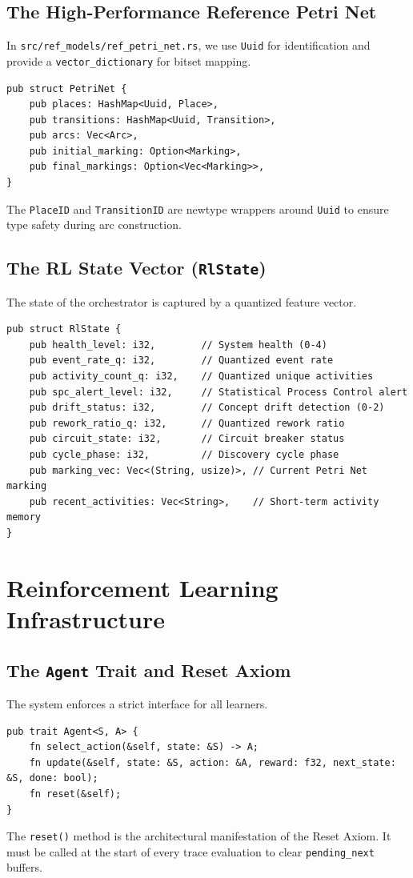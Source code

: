 \documentclass[12pt,a4paper]{report}
\begin{document}
\section{The High-Performance Reference Petri Net}
In \texttt{src/ref\_models/ref\_petri\_net.rs}, we use \texttt{Uuid} for identification and provide a \texttt{vector\_dictionary} for bitset mapping.
\begin{lstlisting}[caption=Ref PetriNet Specification]
pub struct PetriNet {
    pub places: HashMap<Uuid, Place>,
    pub transitions: HashMap<Uuid, Transition>,
    pub arcs: Vec<Arc>,
    pub initial_marking: Option<Marking>,
    pub final_markings: Option<Vec<Marking>>,
}
\end{lstlisting}
The \texttt{PlaceID} and \texttt{TransitionID} are newtype wrappers around \texttt{Uuid} to ensure type safety during arc construction.

\section{The RL State Vector (\texttt{RlState})}
The state of the orchestrator is captured by a quantized feature vector.
\begin{lstlisting}[caption=RlState Struct Specification]
pub struct RlState {
    pub health_level: i32,        // System health (0-4)
    pub event_rate_q: i32,        // Quantized event rate
    pub activity_count_q: i32,    // Quantized unique activities
    pub spc_alert_level: i32,     // Statistical Process Control alert
    pub drift_status: i32,        // Concept drift detection (0-2)
    pub rework_ratio_q: i32,      // Quantized rework ratio
    pub circuit_state: i32,       // Circuit breaker status
    pub cycle_phase: i32,         // Discovery cycle phase
    pub marking_vec: Vec<(String, usize)>, // Current Petri Net marking
    pub recent_activities: Vec<String>,    // Short-term activity memory
}
\end{lstlisting}

\chapter{Reinforcement Learning Infrastructure}
\section{The \texttt{Agent} Trait and Reset Axiom}
The system enforces a strict interface for all learners.
\begin{lstlisting}[caption=Agent Trait Definition]
pub trait Agent<S, A> {
    fn select_action(&self, state: &S) -> A;
    fn update(&self, state: &S, action: &A, reward: f32, next_state: &S, done: bool);
    fn reset(&self);
}
\end{lstlisting}
The \texttt{reset()} method is the architectural manifestation of the Reset Axiom. It must be called at the start of every trace evaluation to clear \texttt{pending\_next} buffers.
\end{document}
